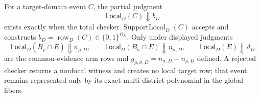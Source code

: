 For a target-domain event \(C\), the partial judgment
\[
\mathsf{Local}_D(C)\Downarrow b_D
\]
exists exactly when the total checker \(\operatorname{SupportLocal}_D(C)\) accepts and constructs \(b_D=\operatorname{row}_D(C)\in\{0,1\}^{\Omega_D}\).  Only under displayed judgments
\[
\mathsf{Local}_D(B_\rho\cap E)\Downarrow n_{\rho,D},
\qquad
\mathsf{Local}_D(B_\sigma\cap E)\Downarrow n_{\sigma,D},
\qquad
\mathsf{Local}_D(E)\Downarrow d_D
\]
are the common-evidence arm rows and \(g_{\rho,\sigma,D}=n_{\sigma,D}-n_{\rho,D}\) defined.  A rejected checker returns a nonfocal witness and creates no local target row; that event remains represented only by its exact multi-district polynomial in the global fibers.